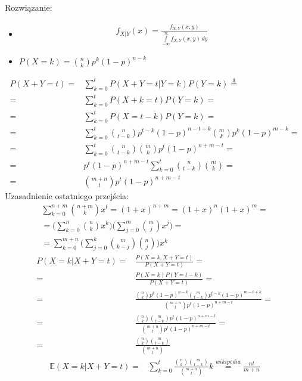 Rozwiązanie:
\begin{itemize}
\item 
\begin{gather*}
f_{X|Y}(x)=\frac{f_{X,Y}(x,y)}{\int\limits_{-\infty }^{\infty }f_{X,Y}(x,y)\,dy}
\end{gather*}
\item $ P\left(X=k\right)=\binom{n}{k}p^{k}(1-p)^{n-k} $
\end{itemize}
\begin{align*}
P\left(X+Y=t\right)=&
\sum_{k=0}^{t}P\left(X+Y=t|Y=k\right)P\left(Y=k\right)
\stackrel{\Perp}{=}\\=&
\sum_{k=0}^{t}P\left(X+k=t\right)P\left(Y=k\right)
=\\=&
\sum_{k=0}^{t}P\left(X=t-k\right)P\left(Y=k\right)
=\\=&
\sum_{k=0}^{t}
\binom{n}{t-k}p^{t-k}(1-p)^{n-t+k}
\binom{m}{k}p^{k}(1-p)^{m-k}
=\\=&
\sum_{k=0}^{t}
\binom{n}{t-k}\binom{m}{k}p^{t}(1-p)^{n+m-t}
=\\=&
p^{t}(1-p)^{n+m-t}\sum_{k=0}^{t}
\binom{n}{t-k}\binom{m}{k}
=\\=&
\binom{m+n}{t}p^{t}(1-p)^{n+m-t}
\end{align*}
Uzasadnienie ostatniego przejścia:
\begin{gather*}
\sum_{k=0}^{n+m}\binom{n+m}{k}x^t
=
\left(1+x\right)^{n+m}
=
\left(1+x\right)^{n}
\left(1+x\right)^{m}
=\\=
\Biggl(\sum_{k=0}^{n}\binom{n}{k}x^k\Biggr)
\Biggl(\sum_{j=0}^{m}\binom{m}{j}x^j\Biggr)
=\\=
\sum_{k=0}^{m+n}\Biggl(\sum_{j=0}^k \binom{m}{k-j}\binom{n}{j}\Biggr) x^k
\end{gather*}
\begin{align*}
P\left(X=k|X+Y=t\right)=&\frac{P\left(X=k,X+Y=t\right)}{P\left(X+Y=t\right)}
=\\=&
\frac{P\left(X=k\right) P\left(Y=t-k\right)}{P\left(X+Y=t\right)}
=\\=&
\frac{\binom{n}{k}p^{k}(1-p)^{n-k}
\binom{m}{t-k}p^{t-k}(1-p)^{m-t+k}}
{\binom{m+n}{t}p^{t}(1-p)^{n+m-t}}
=\\=&
\frac{\binom{n}{k}\binom{m}{t-k}p^{t}(1-p)^{n+m-t}}
{\binom{m+n}{t}p^{t}(1-p)^{n+m-t}}
=\\=&
\frac{\binom{n}{k}\binom{m}{t-k}}
{\binom{m+n}{t}}
\end{align*}
\begin{align*}
\mathbb E \left(X=k|X+Y=t\right)=&
\sum_{k=0}^{t}\frac{\binom{n}{k}\binom{m}{t-k}}
{\binom{m+n}{t}}k
\stackrel{wikipedia}{=}
\frac{nt}{m+n}
\end{align*}


